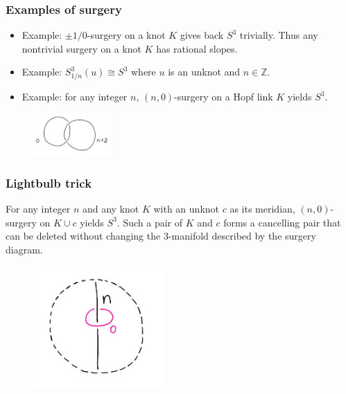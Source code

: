 \documentclass{beamer}
\theoremstyle{ex}
\theoremstyle{rem}
\begin{document}
\begin{frame}
	\frametitle{Examples of surgery}
	\begin{itemize}
		\item Example: $\pm 1/0$-surgery on a knot $K$ gives back $S^3$ trivially. Thus any nontrivial surgery on a knot $K$ has rational slopes.  			
	\end{itemize}
	\begin{itemize}
		\item Example: $S^3_{1/n}(u) \cong S^3$ where $u$ is an unknot and $n \in \mathbb{Z}$.
			\item Example: for any integer $n$, $(n, 0)$-surgery on a Hopf link $K$ yields $S^3$.
	\end{itemize}
\begin{figure}
	\centering
	\includegraphics[width=30mm]{Hopf.jpg}
\end{figure}
		
\end{frame}

\begin{frame}
	\frametitle{Lightbulb trick}
	\begin{theorem}
		For any integer $n$ and any knot $K$ with an unknot $c$ as its meridian, $(n, 0)$-surgery on $K \cup c$ yields $S^3$. Such a pair of $K$ and $c$ forms a cancelling pair that can be deleted without changing the $3$-manifold described by the surgery diagram.
	\end{theorem}
	\begin{figure}
		\centering
		\includegraphics[width=50mm]{Kc.jpg}
	\end{figure}
\end{frame}
\end{document}
